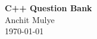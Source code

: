 \begin{titlepage}
    \thispagestyle{empty} %
    \centering
    \vfill                %
    \begin{center}
        {\Huge \textbf{C++ Question Bank}}\\
        \vspace{1cm}
        {\Large Anchit Mulye}\\
        \vspace{0.5cm}
        {\Large \today}
    \end{center}
    \vfill                %
\end{titlepage}
